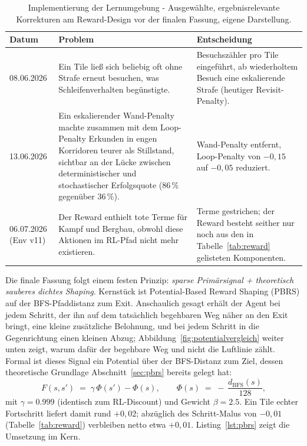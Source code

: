 \documentclass[11pt,a4paper]{article}
\begin{document}
\begin{table}[h]
\centering
\small
\begin{tabular}{@{}p{2.1cm}p{5.3cm}p{5.4cm}@{}}
\toprule
\textbf{Datum} & \textbf{Problem} & \textbf{Entscheidung} \\
\midrule
08.06.2026 &
Ein Tile ließ sich beliebig oft ohne Strafe erneut besuchen, was
Schleifenverhalten begünstigte. &
Besuchszähler pro Tile eingeführt, ab wiederholtem Besuch eine eskalierende
Strafe (heutiger Revisit-Penalty). \\
13.06.2026 &
Ein eskalierender Wand-Penalty machte zusammen mit dem Loop-Penalty
Erkunden in engen Korridoren teurer als Stillstand, sichtbar an der Lücke
zwischen deterministischer und stochastischer Erfolgsquote
(86\,\% gegenüber 36\,\%). &
Wand-Penalty entfernt, Loop-Penalty von $-0{,}15$ auf $-0{,}05$ reduziert. \\
06.07.2026 (Env v11) &
Der Reward enthielt tote Terme für Kampf und Bergbau, obwohl diese
Aktionen im RL-Pfad nicht mehr existieren. &
Terme gestrichen; der Reward besteht seither nur noch aus den in
Tabelle~\ref{tab:reward} gelisteten Komponenten. \\
\bottomrule
\end{tabular}
\caption[Zwischenschritte des Reward-Designs]{Implementierung der
Lernumgebung - Ausgewählte, ergebnisrelevante Korrekturen am Reward-Design
vor der finalen Fassung, eigene Darstellung.}
\label{tab:reward_iter}
\end{table}

Die finale Fassung folgt einem festen Prinzip: \emph{sparse
Primärsignal + theoretisch sauberes dichtes Shaping}. Kernstück ist
Potential-Based Reward Shaping (PBRS) auf der BFS-Pfaddistanz zum Exit.
Anschaulich gesagt erhält der Agent bei jedem Schritt, der ihn auf dem
tatsächlich begehbaren Weg näher an den Exit bringt, eine kleine zusätzliche
Belohnung, und bei jedem Schritt in die Gegenrichtung einen kleinen Abzug;
Abbildung~\ref{fig:potentialvergleich} weiter unten zeigt, warum dafür der
begehbare Weg und nicht die Luftlinie zählt. Formal ist dieses Signal ein
Potential über der BFS-Distanz zum Ziel, dessen theoretische Grundlage
Abschnitt~\ref{sec:pbrs} bereits gelegt hat:
\begin{equation}
F(s, s') \;=\; \gamma\,\Phi(s') - \Phi(s), \qquad
\Phi(s) \;=\; -\,\frac{d_{\mathrm{BFS}}(s)}{128},
\end{equation}
mit $\gamma = 0.999$ (identisch zum RL-Discount) und Gewicht $\beta = 2.5$.
Ein Tile echter Fortschritt liefert damit rund $+0{,}02$; abzüglich des
Schritt-Malus von $-0{,}01$ (Tabelle~\ref{tab:reward}) verbleiben netto etwa
$+0{,}01$. Listing~\ref{lst:pbrs} zeigt die Umsetzung im Kern.
\end{document}
